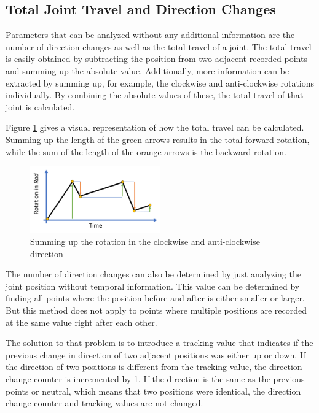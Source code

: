 
\subsection{Total Joint Travel and Direction Changes}
Parameters that can be analyzed without any additional information are the number of direction changes as well as the total travel of a joint. The total travel is easily obtained by subtracting the position from two adjacent recorded points and summing up the absolute value. Additionally, more information can be extracted by summing up, for example, the clockwise and anti-clockwise rotations individually. By combining the absolute values of these, the total travel of that joint is calculated.

Figure \ref{travel} gives a visual representation of how the total travel can be calculated. Summing up the length of the green arrows results in the total forward rotation, while the sum of the length of the orange arrows is the backward rotation.

\begin{figure}[H]
	\centerline{\includegraphics[width=0.5\textwidth]{figures/travel.png}}
	\caption{Summing up the rotation in the clockwise and anti-clockwise direction }
	\label{travel}
\end{figure}

The number of direction changes can also be determined by just analyzing the joint position without temporal information. This value can be determined by finding all points where the position before and after is either smaller or larger. 
But this method does not apply to points where multiple positions are recorded at the same value right after each other.

The solution to that problem is to introduce a tracking value that indicates if the previous change in direction of two adjacent positions was either up or down. If the direction of two positions is different from the tracking value, the direction change counter is incremented by 1. If the direction is the same as the previous points or neutral, which means that two positions were identical, the direction change counter and tracking values are not changed.



